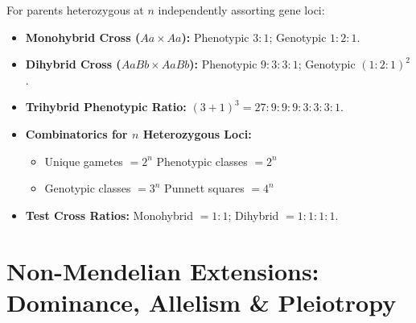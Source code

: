 \documentclass[10pt,twoside,openright]{book}
\begin{document}
\begin{formulabox}
For parents heterozygous at $n$ independently assorting gene loci:
\begin{itemize}[leftmargin=*]
  \item \textbf{Monohybrid Cross ($Aa \times Aa$):} Phenotypic $3:1$; Genotypic $1:2:1$.
  \item \textbf{Dihybrid Cross ($AaBb \times AaBb$):} Phenotypic $9:3:3:1$; Genotypic $(1:2:1)^2$.
  \item \textbf{Trihybrid Phenotypic Ratio:} $(3+1)^3 = 27:9:9:9:3:3:3:1$.
  \item \textbf{Combinatorics for $n$ Heterozygous Loci:}
  \begin{itemize}
    \item Unique gametes $= 2^n$ \qquad Phenotypic classes $= 2^n$
    \item Genotypic classes $= 3^n$ \qquad Punnett squares $= 4^n$
  \end{itemize}
  \item \textbf{Test Cross Ratios:} Monohybrid $= 1:1$; Dihybrid $= 1:1:1:1$.
\end{itemize}
\end{formulabox}

\section{Non-Mendelian Extensions: Dominance, Allelism \& Pleiotropy}
\end{document}

